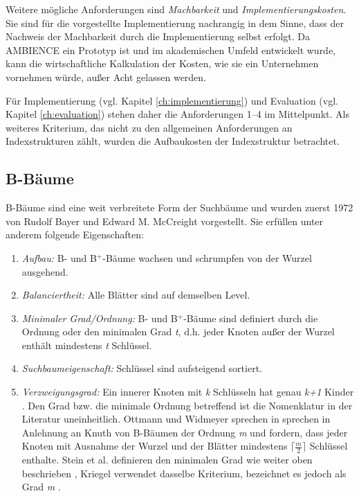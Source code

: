 Weitere mögliche Anforderungen sind \textit{Machbarkeit} und \textit{Implementierungskosten}. Sie sind für die vorgestellte Implementierung nachrangig in dem Sinne, dass der Nachweis der Machbarkeit durch die Implementierung selbst erfolgt. Da AMBIENCE ein Prototyp ist und im akademischen Umfeld entwickelt wurde, kann die wirtschaftliche Kalkulation der Kosten, wie sie ein Unternehmen vornehmen würde, außer Acht gelassen werden. 

Für Implementierung (vgl. Kapitel \ref{ch:implementierung}) und Evaluation (vgl. Kapitel \ref{ch:evaluation}) stehen daher die Anforderungen 1--4 im Mittelpunkt. Als weiteres Kriterium, das nicht zu den allgemeinen Anforderungen an Indexstrukturen zählt, wurden die Aufbaukosten der Indexstruktur betrachtet. 
\subsection{B-Bäume}\label{sec:b-bäume}
B-Bäume sind eine weit verbreitete Form der Suchbäume und wurden zuerst 1972 von Rudolf Bayer und Edward M. McCreight vorgestellt. Sie erfüllen unter anderem folgende Eigenschaften:  
\begin{enumerate}
\setlength{\itemsep}{20pt}
	\item \textit{Aufbau:} B- und B$^+$-Bäume wachsen und schrumpfen von der Wurzel ausgehend.
	\item \textit{Balanciertheit:} Alle Blätter sind auf demselben Level. 
	\item \textit{Minimaler Grad/Ordnung:} B- und B$^+$-Bäume sind definiert durch die Ordnung oder den minimalen Grad \textit{t}, d.h. jeder Knoten außer der Wurzel enthält mindestens \textit{t} Schlüssel. 
	\item \textit{Suchbaumeigenschaft:} Schlüssel sind aufsteigend sortiert.
	\item \textit{Verzweigungsgrad:} Ein innerer Knoten mit \textit{k} Schlüsseln hat genau \textit{k+1} Kinder \cite{Ottmann2012}. Den Grad bzw. die minimale Ordnung betreffend ist die Nomenklatur in der Literatur uneinheitlich. Ottmann und Widmeyer \cite{Ottmann2012} sprechen in sprechen in Anlehnung an Knuth \cite{Knuth1999} von B-Bäumen der Ordnung \textit{m} und fordern, dass jeder Knoten mit Ausnahme der Wurzel und der Blätter mindestens $\lceil\frac{m}{2}\rceil$ Schlüssel enthalte. Stein et al. definieren den minimalen Grad wie weiter oben beschrieben \cite{Stein2009}, Kriegel verwendet dasselbe Kriterium, bezeichnet es jedoch als Grad \textit{m} \cite{Kriegel1994--2013}.
\end{enumerate}	
